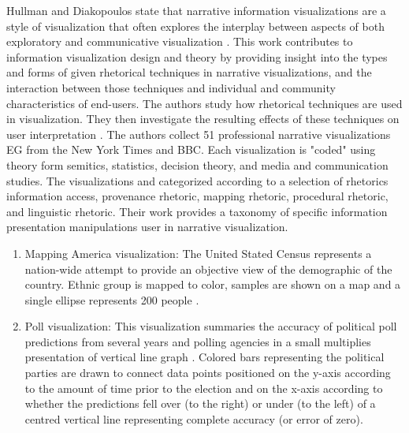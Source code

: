 \documentclass{egpubl}
\begin{document}
Hullman and Diakopoulos state that narrative information visualizations are a style of visualization that often explores the interplay between aspects of both exploratory and communicative visualization \cite{hullman}.
This work contributes to information visualization  design and theory by providing insight into the types and forms of given rhetorical techniques in narrative visualizations, and the interaction between those techniques and individual and community characteristics of end-users. The authors study how rhetorical techniques are used in visualization. They then investigate the resulting effects of these techniques on user interpretation \cite{hullman}.
The authors collect 51 professional narrative visualizations EG from the New York Times and BBC. Each visualization is "coded" using theory form semitics, statistics, decision theory, and media and communication studies. The visualizations and categorized according to a selection of rhetorics information access, provenance rhetoric, mapping rhetoric, procedural rhetoric, and linguistic rhetoric. Their work provides a taxonomy of specific information presentation manipulations user in narrative visualization.
\begin{enumerate}
\item Mapping America visualization: The United Stated Census represents a nation-wide attempt to provide an objective view of the demographic of the country. Ethnic group is mapped to color, samples are shown on a map and a single ellipse represents 200 people \cite{Bloch}.
\item Poll visualization: This visualization summaries the accuracy of political poll predictions from several years and polling agencies in a small multiplies presentation of vertical line graph \cite{McCandless}. Colored bars representing the political parties are drawn to connect data points positioned on the y-axis according to the amount of time prior to the election and on the x-axis according to whether the predictions fell over (to the right) or under (to the left) of a centred vertical line representing complete accuracy (or error of zero). 
\end{enumerate}
\end{document}
